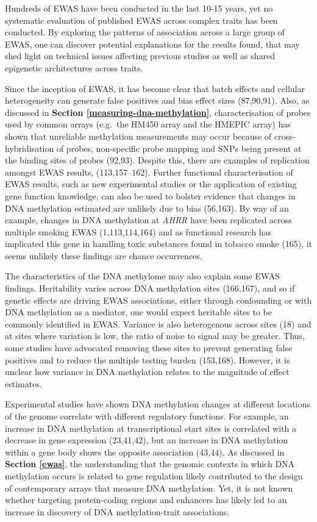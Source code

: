 \documentclass[11pt,twoside]{bristolthesis}
\begin{document}
Hundreds of EWAS have been conducted in the last 10-15 years, yet no systematic evaluation of published EWAS across complex traits has been conducted. By exploring the patterns of association across a large group of EWAS, one can discover potential explanations for the results found, that may shed light on technical issues affecting previous studies as well as shared epigenetic architectures across traits.

Since the inception of EWAS, it has become clear that batch effects and cellular heterogeneity can generate false positives and bias effect sizes (87,90,91). Also, as discussed in \textbf{Section \ref{measuring-dna-methylation}}, characterisation of probes used by common arrays (e.g.~the HM450 array and the HMEPIC array) has shown that unreliable methylation measurements may occur because of cross-hybridisation of probes, non-specific probe mapping and SNPs being present at the binding sites of probes (92,93). Despite this, there are examples of replication amongst EWAS results, (113,157--162). Further functional characterisation of EWAS results, such as new experimental studies or the application of existing gene function knowledge, can also be used to bolster evidence that changes in DNA methylation estimated are unlikely due to bias (56,163). By way of an example, changes in DNA methylation at \emph{AHRR} have been replicated across multiple smoking EWAS (1,113,114,164) and as functional research has implicated this gene in handling toxic substances found in tobacco smoke (165), it seems unlikely these findings are chance occurrences.

The characteristics of the DNA methylome may also explain some EWAS findings. Heritability varies across DNA methylation sites (166,167), and so if genetic effects are driving EWAS associations, either through confounding or with DNA methylation as a mediator, one would expect heritable sites to be commonly identified in EWAS. Variance is also heterogenous across sites (18) and at sites where variation is low, the ratio of noise to signal may be greater. Thus, some studies have advocated removing these sites to prevent generating false positives and to reduce the multiple testing burden (153,168). However, it is unclear how variance in DNA methylation relates to the magnitude of effect estimates.

Experimental studies have shown DNA methylation changes at different locations of the genome correlate with different regulatory functions. For example, an increase in DNA methylation at transcriptional start sites is correlated with a decrease in gene expression (23,41,42), but an increase in DNA methylation within a gene body shows the opposite association (43,44). As discussed in \textbf{Section \ref{ewas}}, the understanding that the genomic contexts in which DNA methylation occurs is related to gene regulation likely contributed to the design of contemporary arrays that measure DNA methylation. Yet, it is not known whether targeting protein-coding regions and enhancers has likely led to an increase in discovery of DNA methylation-trait associations.
\end{document}

